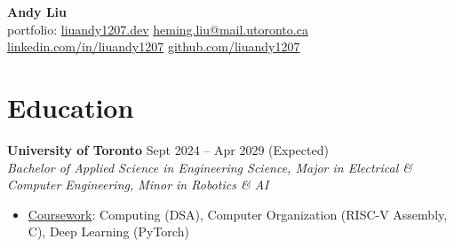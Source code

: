 \documentclass[10pt,letterpaper]{article}
\begin{document}
\begin{center}
\huge{\textbf{Andy Liu}} \\
\vspace{0.25em}
\small{{portfolio: 
    \href{https://liuandy1207.dev}{liuandy1207.dev}}
    \hspace{0.5em} \textbar\hspace{0.5em}
    \href{mailto: heming.liu@mail.utoronto.ca}{heming.liu@mail.utoronto.ca}
    \hspace{0.5em} \textbar\hspace{0.5em}
    \href{https://www.linkedin.com/in/liuandy1207/}{linkedin.com/in/liuandy1207}}
    \hspace{0.5em} \textbar\hspace{0.5em}
    \href{https://github.com/liuandy1207}{github.com/liuandy1207}
\end{center} \vspace{-0.7em}







\section{Education}

\textbf{University of Toronto} \hfill
Sept 2024 -- Apr 2029 (Expected) \\
\textit{Bachelor of Applied Science in Engineering Science, Major in Electrical \& Computer Engineering, Minor in Robotics \& AI} \hfill 
\begin{itemize}
    \item \underline{Coursework}: 
    Computing (DSA),
    Computer Organization (RISC-V Assembly, C), Deep Learning (PyTorch)
\end{itemize} \vspace{0.25em}
\end{document}
